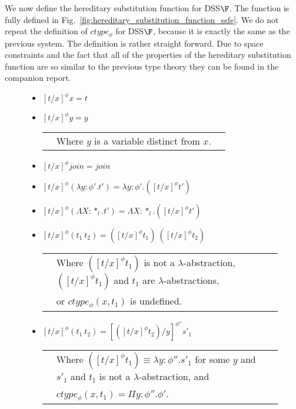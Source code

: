 We now define the hereditary substitution function for DSS$\F$.  The
function is fully defined in
Fig.~\ref{fig:hereditary_substitution_function_ssfe}.  We do not
repeat the definition of $ctype_\phi$ for DSS$\F$, because it is
exactly the same as the previous system. The definition is rather
straight forward.  Due to space constraints and the fact that all of
the properties of the hereditary substitution function are so similar
to the previous type theory they can be found in the companion report.
\begin{figure}[t]
  \small
  \begin{itemize}
  \item[] $[t/x]^\phi x = t$

  \item[] $[t/x]^\phi y = y$\\
    \begin{tabular}{lll}
      & Where $y$ is a variable distinct from $x$.\\
    \end{tabular}

  \item[] $[t/x]^\phi join = join$

  \item[] $[t/x]^\phi (\lambda y:\phi'.t') = \lambda y:\phi'.([t/x]^\phi t')$

  \item[] $[t/x]^\phi (\Lambda X:*_l.t') = \Lambda X:*_l.([t/x]^\phi t')$

  \item[] $[t/x]^\phi (t_1\ t_2) = ([t/x]^\phi t_1)\ ([t/x]^\phi t_2)$\\
    \begin{tabular}{lll}
      & Where $([t/x]^\phi t_1)$ is not a $\lambda$-abstraction, 
      $([t/x]^\phi t_1)$ and $t_1$ are $\lambda$-abstractions,\\ 
      & or $ctype_\phi(x,t_1)$ is undefined.
    \end{tabular}

  \item[] $[t/x]^{\phi} (t_1\ t_2) = [([t/x]^{\phi} t_2)/y]^{\phi''} s'_1$\\
    \begin{tabular}{lll}
      & Where $([t/x]^{\phi} t_1) \equiv \lambda y:\phi''.s'_1$ 
        for some $y$ and $s'_1$ and $t_1$ is not a $\lambda$-abstraction, and \\
      & $ctype_\phi(x,t_1) = \Pi y:\phi''.\phi'$.\\
    \end{tabular}


\end{itemize}
\end{figure}
